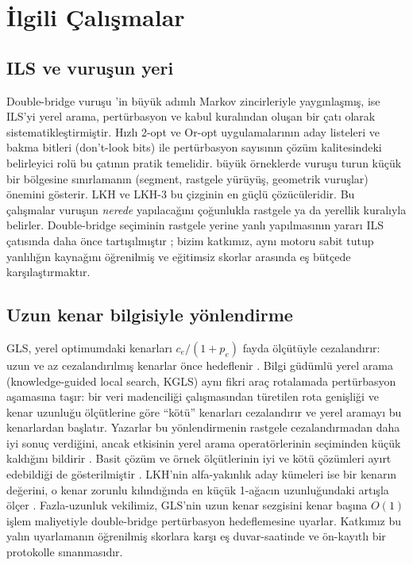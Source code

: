 \section{İlgili Çalışmalar}\label{sec:ilgili-calismalar}

\subsection{ILS ve vuruşun yeri}
Double-bridge vuruşu \citet{martin_1992_largestep}'in büyük adımlı Markov zincirleriyle yaygınlaşmış,
\citet{lourenco_2010_ils} ise ILS'yi yerel arama, pertürbasyon ve kabul kuralından oluşan bir çatı
olarak sistematikleştirmiştir. Hızlı 2-opt ve Or-opt uygulamalarının aday listeleri ve bakma
bitleri (don't-look bits) \citep{bentley_1992_fast} ile pertürbasyon sayısının çözüm kalitesindeki
belirleyici rolü \citep{johnson_1997_case} bu çatının pratik temelidir. \citet{applegate_2003_clk}
büyük örneklerde vuruşu turun küçük bir bölgesine sınırlamanın (segment, rastgele yürüyüş,
geometrik vuruşlar) önemini gösterir. LKH \citep{helsgaun_2000_lkh} ve LKH-3 \citep{helsgaun_2017_lkh3}
bu çizginin en güçlü çözücüleridir. Bu çalışmalar vuruşun \emph{nerede} yapılacağını çoğunlukla
rastgele ya da yerellik kuralıyla belirler. Double-bridge seçiminin rastgele yerine yanlı
yapılmasının yararı ILS çatısında daha önce tartışılmıştır \citep{lourenco_2010_ils}; bizim
katkımız, aynı motoru sabit tutup yanlılığın kaynağını öğrenilmiş ve eğitimsiz skorlar arasında eş
bütçede karşılaştırmaktır.

\subsection{Uzun kenar bilgisiyle yönlendirme}
GLS, yerel optimumdaki kenarları $c_e/(1+p_e)$ fayda ölçütüyle cezalandırır: uzun ve az
cezalandırılmış kenarlar önce hedeflenir \citep{voudouris_1999_gls}. Bilgi güdümlü yerel arama (knowledge-guided local search, KGLS) aynı fikri araç rotalamada pertürbasyon aşamasına taşır: bir veri madenciliği çalışmasından türetilen rota genişliği ve kenar uzunluğu ölçütlerine göre ``kötü'' kenarları cezalandırır ve yerel aramayı bu kenarlardan başlatır. Yazarlar bu yönlendirmenin rastgele cezalandırmadan daha iyi sonuç verdiğini, ancak etkisinin yerel arama operatörlerinin seçiminden küçük kaldığını bildirir \citep{arnold_2019_kgls}. Basit
çözüm ve örnek ölçütlerinin iyi ve kötü çözümleri ayırt edebildiği de gösterilmiştir
\citep{arnold_2019_vrpgood}. LKH'nin alfa-yakınlık aday kümeleri ise bir kenarın değerini, o kenar zorunlu kılındığında en küçük 1-ağacın uzunluğundaki artışla ölçer \citep{helsgaun_2000_lkh}. Fazla-uzunluk vekilimiz, GLS'nin uzun kenar sezgisini kenar başına $O(1)$ işlem maliyetiyle
double-bridge pertürbasyon hedeflemesine uyarlar. Katkımız bu yalın uyarlamanın öğrenilmiş
skorlara karşı eş duvar-saatinde ve ön-kayıtlı bir protokolle sınanmasıdır.

